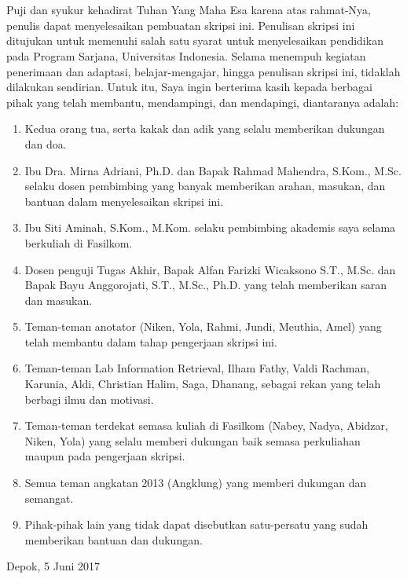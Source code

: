 \chapter*{\kataPengantar}
Puji dan syukur kehadirat Tuhan Yang Maha Esa karena atas rahmat-Nya, penulis dapat menyelesaikan pembuatan skripsi ini. Penulisan skripsi ini ditujukan untuk memenuhi salah satu syarat untuk menyelesaikan pendidikan pada Program Sarjana, Universitas Indonesia. Selama menempuh kegiatan penerimaan dan adaptasi, belajar-mengajar, hingga penulisan skripsi ini, tidaklah dilakukan sendirian. Untuk itu, Saya ingin berterima kasih kepada berbagai pihak yang telah membantu, mendampingi, dan mendapingi, diantaranya adalah:

\begin{enumerate}
  \item Kedua orang tua, serta kakak dan adik yang selalu memberikan dukungan dan doa.
  \item Ibu Dra. Mirna Adriani, Ph.D. dan Bapak Rahmad Mahendra, S.Kom., M.Sc. selaku dosen pembimbing yang banyak memberikan arahan, masukan, dan bantuan dalam menyelesaikan skripsi ini.
  \item Ibu Siti Aminah, S.Kom., M.Kom. selaku pembimbing akademis saya selama berkuliah di Fasilkom.
  \item Dosen penguji Tugas Akhir, Bapak Alfan Farizki Wicaksono S.T., M.Sc. dan Bapak Bayu Anggorojati, S.T., M.Sc., Ph.D. yang telah memberikan saran dan masukan.
  \item Teman-teman anotator (Niken, Yola, Rahmi, Jundi, Meuthia, Amel) yang telah membantu dalam tahap pengerjaan skripsi ini.
  \item Teman-teman Lab Information Retrieval, Ilham Fathy, Valdi Rachman, Karunia, Aldi, Christian Halim, Saga, Dhanang, sebagai rekan yang telah berbagi ilmu dan motivasi.
  \item Teman-teman terdekat semasa kuliah di Fasilkom (Nabey, Nadya, Abidzar, Niken, Yola) yang selalu memberi dukungan baik semasa perkuliahan maupun pada pengerjaan skripsi.
  \item Semua teman angkatan 2013 (Angklung) yang memberi dukungan dan semangat.
  \item Pihak-pihak lain yang tidak dapat disebutkan satu-persatu yang sudah memberikan bantuan dan dukungan.
\end{enumerate}

\vspace*{0.1cm}
\begin{flushright}
Depok, 5 Juni 2017\\[0.1cm]
\vspace*{1cm}
\penulis

\end{flushright}

